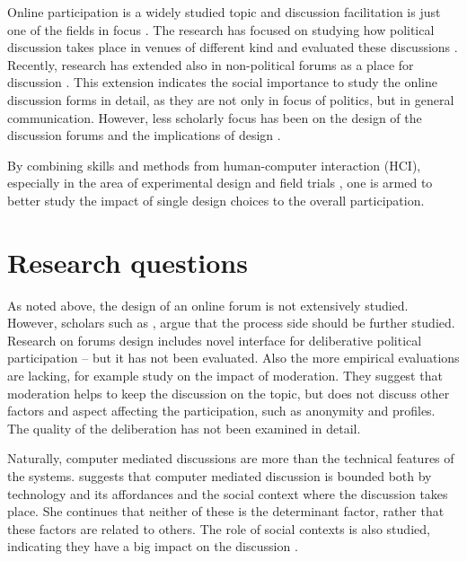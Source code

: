 \documentclass[journal,a4paper]{IEEEtran}
\begin{document}
Online participation is a widely studied topic and discussion facilitation is just one of the fields in focus . The research has focused on studying how political discussion takes place in venues of different kind  and evaluated these discussions . Recently, research has extended also in non-political forums as a place for discussion \cite{graham12}. This extension indicates the social importance to study the online discussion forms in detail, as they are not only in focus of politics, but in general communication. However, less scholarly focus has been on the design of the discussion forums and the implications of design .

By combining skills and methods from human-computer interaction (HCI), especially in the area of experimental design and field trials , one is armed to better study the impact of single design choices to the overall participation.

\section{Research questions}
As noted above, the design of an online forum is not extensively studied. However, scholars such as , argue that the process side should be further studied.  Research on forums design includes  novel interface for deliberative political participation -- but it has not been evaluated. Also the more empirical evaluations are lacking, for example  study on the impact of moderation. They suggest that moderation helps to keep the discussion on the topic, but does not discuss other factors and aspect affecting the participation, such as anonymity and profiles. The quality of the deliberation has not been examined in detail.

Naturally, computer mediated discussions are more than the technical features of the systems.  suggests that computer mediated discussion is bounded both by technology and its affordances and the social context where the discussion takes place. She continues that neither of these is the determinant factor, rather that these factors are related to others. The role of social contexts is also studied, indicating they have a big impact on the discussion \cite{sukumaran11,underhill03}.
\end{document}
